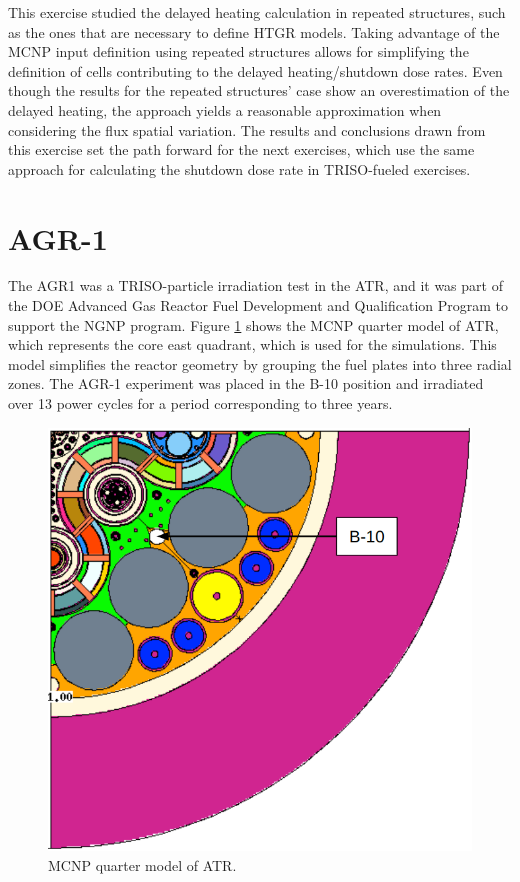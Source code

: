 This exercise studied the delayed heating calculation in repeated structures, such as the ones that are necessary to define HTGR models.
Taking advantage of the MCNP input definition using repeated structures allows for simplifying the definition of cells contributing to the delayed heating/shutdown dose rates.
Even though the results for the repeated structures' case show an overestimation of the delayed heating, the approach yields a reasonable approximation when considering the flux spatial variation.
The results and conclusions drawn from this exercise set the path forward for the next exercises, which use the same approach for calculating the shutdown dose rate in TRISO-fueled exercises.


\section{AGR-1}
\label{sec:agr}


The \gls*{AGR1} \cite{sterbentz_agr1_2018} was a TRISO-particle irradiation test in the \gls*{ATR}, and it was part of the \gls*{DOE} Advanced Gas Reactor Fuel Development and Qualification Program to support the \gls*{NGNP} program.
Figure \ref{fig:atrq} shows the MCNP quarter model of ATR, which represents the core east quadrant, which is used for the simulations.
This model simplifies the reactor geometry by grouping the fuel plates into three radial zones.
The AGR-1 experiment was placed in the B-10 position and irradiated over 13 power cycles for a period corresponding to three years.

\begin{figure}[htbp!] %
    \centering
    \includegraphics[width=0.70\linewidth]{figures/atr-quarter2}
    \hfill
    \caption{MCNP quarter model of ATR.}
    \label{fig:atrq}
\end{figure}

